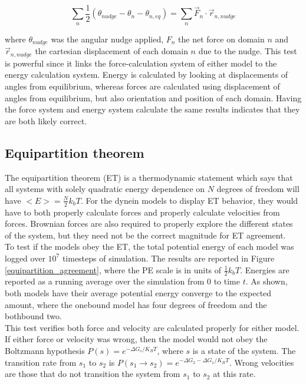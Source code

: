 \documentclass[
11pt, %
english, %
singlespacing, %
headsepline, %
chapterinoneline, %
]{MastersDoctoralThesis} %
\begin{document}
\begin{equation}
  \sum_n \frac12 \left(\theta_{nudge} - \theta_{n} - \theta_{n,eq}\right) = \sum_n \vec{F}_n \cdot \vec{r}_{n,nudge}
\end{equation}

where $\theta_{nudge}$ was the angular nudge applied, $F_n$ the net force on domain $n$ and $\vec{r}_{n,nudge}$ the cartesian displacement of each domain $n$ due to the nudge. This test is powerful since it links the force-calculation system of either model to the energy calculation system. Energy is calculated by looking at displacements of angles from equilibrium, whereas forces are calculated using displacement of angles from equilibrium, but also orientation and position of each domain. Having the force system and energy system calculate the same results indicates that they are both likely correct.\\

\subsection{Equipartition theorem}
The equipartition theorem (ET) is a thermodynamic statement which says that all systems with solely quadratic energy dependence on $N$ degrees of freedom will have $<E> = \frac N2 k_bT$. For the dynein models to display ET behavior, they would have to both properly calculate forces and properly calculate velocities from forces. Brownian forces are also required to properly explore the different states of the system, but they need not be the correct magnitude for ET agreement.\\

To test if the models obey the ET, the total potential energy of each model was logged over $10^7$ timesteps of simulation. The results are reported in Figure \ref{equipartition_agreement}, where the PE scale is in units of $\frac12 k_bT$. Energies are reported as a running average over the simulation from 0 to time $t$. As shown, both models have their average potential energy converge to the expected amount, where the onebound model has four degrees of freedom and the bothbound two.\\

This test verifies both force and velocity are calculated properly for either model. If either force or velocity was wrong, then the model would not obey the Boltzmann hypothesis $P(s) = e^{-\Delta G_{s}/K_BT}$, where $s$ is a state of the system. The transition rate from $s_1$ to $s_2$ is $P(s_1\rightarrow s_2) = e^{-{\Delta G_2 - \Delta G_1}/K_BT}$. Wrong velocities are those that do not transition the system from $s_1$ to $s_2$ at this rate.\\
\end{document}
